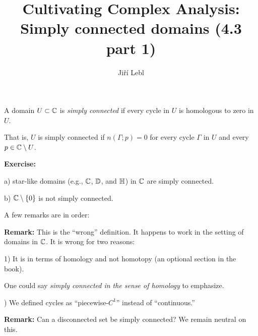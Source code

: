 \documentclass[10pt,aspectratio=169]{beamer}
\author{Ji\v{r}\'i Lebl}
\institute[OSU]{%
Departemento pri Matematiko de Oklahoma {\^S}tata Universitato}
\title{Cultivating Complex Analysis:\\%
Simply connected domains (4.3 part 1)}
\date{}
\begin{document}
\begin{frame}
\titlepage
\end{frame}

\begin{frame}
\begin{definition}
A domain $U \subset {\mathbb{C}}$ is \emph{simply connected}
if every cycle in $U$
is homologous to zero in $U$.
\end{definition}

\pause
That is, $U$ is simply connected if $n(\Gamma;p) = 0$ for every cycle $\Gamma$ in $U$ and
every $p \in {\mathbb{C}} \setminus U$.

\pause
\medskip
\textbf{Exercise:}

a) star-like domains (e.g., ${\mathbb{C}}$, ${\mathbb{D}}$, and ${\mathbb{H}}$) in ${\mathbb{C}}$ are simply connected.

\pause
b) ${\mathbb{C}} \setminus \{ 0 \}$ is not simply connected.

\pause
\medskip

A few remarks are in order:

\medskip
\pause

\textbf{Remark:}
This is the ``wrong'' definition.  It happens to work in the setting of
domains in ${\mathbb{C}}$.  It is wrong for two reasons:

\pause
\medskip

1) It is in terms of homology and not homotopy (an optional
section in the book).

\medskip
\pause

One could say \emph{simply connected in the sense of homology} to emphasize.

\medskip
{}) We defined cycles as ``piecewise-$C^1$'' instead of ``continuous.''

\medskip
\pause

\textbf{Remark:}
Can a disconnected set be simply connected?
We remain neutral on this.

\end{frame}
\end{document}
